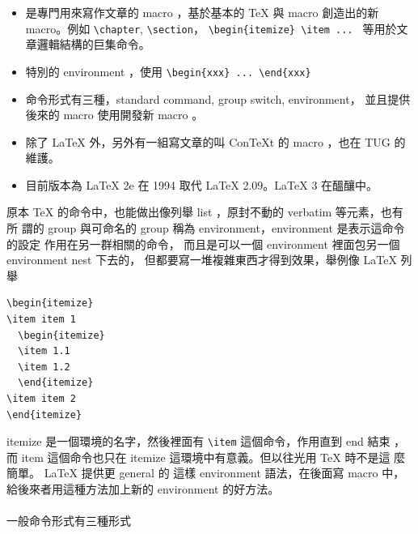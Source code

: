 \begin{itemize}
  \item 是專門用來寫作文章的 macro ，基於基本的 \TeX{} 與 macro 創造出的新
    macro。例如 \verb=\chapter=, \verb=\section=，
    \verb=\begin{itemize} \item ... = 等用於文章邏輯結構的巨集命令。
  \item 特別的 environment ，使用 \verb=\begin{xxx} ... \end{xxx}=
  \item 命令形式有三種，standard command, group switch, environment，
    並且提供後來的 macro 使用開發新 macro 。
  \item 除了 \LaTeX{} 外，另外有一組寫文章的叫 ConTeXt 的 macro ，也在 TUG 的
    維護。
  \item 目前版本為 \LaTeX{} 2e 在 1994 取代 \LaTeX{} 2.09。\LaTeX{} 3 在醞釀中。
\end{itemize}
原本 \TeX{} 的命令中，也能做出像列舉 list ，原封不動的 verbatim 等元素，也有所
謂的 group 與可命名的 group 稱為 environment，environment 是表示這命令的設定
作用在另一群相關的命令， 而且是可以一個 environment 裡面包另一個 environment
nest 下去的， 但都要寫一堆複雜東西才得到效果，舉例像 \LaTeX{} 列舉
\begin{verbatim}
\begin{itemize}
\item item 1
  \begin{itemize}
  \item 1.1
  \item 1.2
  \end{itemize}
\item item 2
\end{itemize}
\end{verbatim}
itemize 是一個環境的名字，然後裡面有 \verb=\item= 這個命令，作用直到 end 結束
，而 item 這個命令也只在 itemize 這環境中有意義。但以往光用 \TeX{} 時不是這
麼簡單。 \LaTeX{} 提供更 general 的 這樣 environment 語法，在後面寫 macro 中，
給後來者用這種方法加上新的 environment 的好方法。
\\\\
一般命令形式有三種形式
